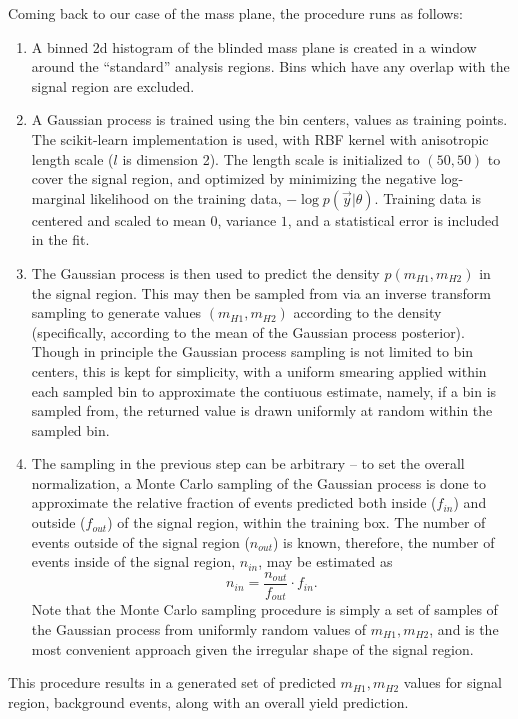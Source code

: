 Coming back to our case of the mass plane, the procedure runs as follows:
\begin{enumerate}
	\item A binned 2d histogram of the blinded mass plane is created in a window 
	around the ``standard'' analysis regions. Bins which have any overlap with the 
	signal region are excluded.
	\item A Gaussian process is trained using the bin centers, values as training points. 
	The scikit-learn  implementation is used, with RBF kernel with anisotropic length scale 
	($l$ is dimension 2).  The length scale is initialized to $(50, 50)$ to cover the signal region, 
	and optimized by minimizing the negative log-marginal likelihood on the training data, 
	$-\log p(\vec{y}|\theta)$. Training data is centered and scaled to mean $0$, variance $1$, 
	and a statistical error is included in the fit.
	\item The Gaussian process is then used to predict the density $p(m_{H1}, m_{H2})$ in the signal region. 
	This may then be sampled from via an inverse transform sampling to generate values $(m_{H1}, m_{H2})$ 
	according to the density (specifically, according to the mean of the Gaussian process posterior). 
	Though in principle the Gaussian process sampling is not limited 
	to bin centers, this is kept for simplicity, with a uniform smearing applied within each 
	sampled bin to approximate the contiuous estimate, namely, if a bin is sampled from, the 
	returned value is drawn uniformly at random within the sampled bin. 
	\item The sampling in the previous step can be arbitrary -- to set the overall normalization, 
	a Monte Carlo sampling of the Gaussian process is done to approximate the relative fraction 
	of events predicted both inside ($f_{in}$) and outside ($f_{out}$) of the signal region, within 
	the training box. The number of events outside of the signal region ($n_{out}$) is known, therefore, 
	the number of events inside of the signal region, $n_{in}$, may be estimated as 
	\begin{equation}
	n_{in} = \frac{n_{out}}{f_{out}}\cdot f_{in}.
	\end{equation}
	Note that the Monte Carlo sampling procedure is simply a set of samples of the Gaussian 
	process from uniformly random values of $m_{H1}, m_{H2}$, and is the most convenient 
	approach given the irregular shape of the signal region.
\end{enumerate}
This procedure results in a generated set of predicted $m_{H1}, m_{H2}$ values for signal region, 
background events, along with an overall yield prediction.

